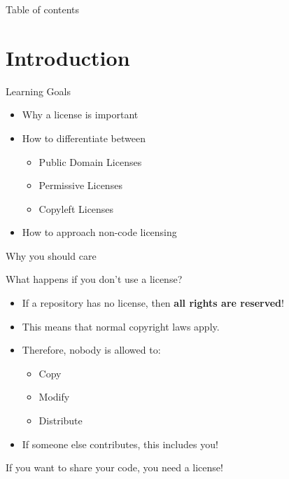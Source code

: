 \documentclass[compress,aspectratio=169]{beamer}
\begin{document}
	\begin{frame}[plain]
		\titlepage
	\end{frame}

	\begin{frame}[t]{Table of contents}
		\tableofcontents[subsectionstyle=hide/hide]
	\end{frame}


	\section{Introduction}

	\begin{frame}{Learning Goals}
		\begin{itemize}
			\item Why a license is important
      \item How to differentiate between
        \begin{itemize}
          \item Public Domain Licenses
          \item Permissive Licenses
          \item Copyleft Licenses
        \end{itemize}
      \item How to approach non-code licensing
		\end{itemize}
	\end{frame}

	\begin{frame}{Why you should care}
    \begin{block}{What happens if you don't use a license? \cite{nolicense}}
      \begin{itemize}
        \item If a repository has no license, then \textbf{all rights are reserved}!
        \item This means that normal copyright laws apply.
        \item Therefore, nobody is allowed to:
          \begin{itemize}
            \item Copy
            \item Modify
            \item Distribute
          \end{itemize}
        \item If someone else contributes, this includes you!
      \end{itemize}
    \end{block}
    \begin{center}
      \Large If you want to share your code, you need a license!
    \end{center}
	\end{frame}
\end{document}
